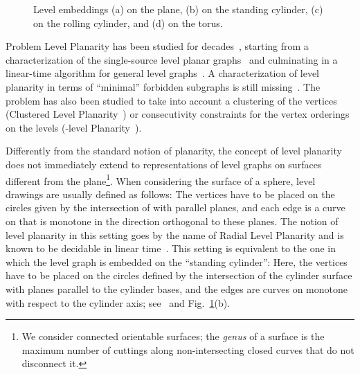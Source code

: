 \documentclass{llncs}
\begin{document}
\begin{figure}[tb!]
    \centering
      \hfill
      \hfill
      \hfill
    \caption{Level embeddings (a) on the plane, (b) on the standing cylinder, (c) on the rolling cylinder, and (d) on the torus.}
\label{fig:drawings}
\end{figure}

Problem {\sc Level Planarity} has been studied for decades~\cite{dn-hpt-88,hp-rlpdlt-95,jlm-lptlt-98,rsbhkmsc-sfplg-01,Fulek2013}, starting from a characterization of the single-source level planar graphs~\cite{dn-hpt-88} and culminating in a linear-time algorithm for general level graphs~\cite{jlm-lptlt-98}.
A characterization of level planarity in terms of ``minimal'' forbidden subgraphs is still missing~\cite{efk-clptmp-09,hkl-clpg-04}.
The problem has also been studied to take into account a clustering of the vertices ({\sc Clustered Level Planarity}~\cite{tibp-addfr-15,fb-clp-04}) or consecutivity constraints for the vertex orderings on the levels ({\sc -level Planarity}~\cite{tibp-addfr-15,wsp-gktlg-12}).

Differently from the standard notion of planarity, the concept of level planarity does not immediately extend to representations of level graphs on surfaces different from the plane\footnote{We consider connected orientable surfaces; the {\em genus} of a surface is the maximum number of cuttings along non-intersecting closed curves that do not disconnect it.}. When considering the surface  of a sphere, level drawings are usually defined as follows: The vertices have to be placed on the  circles given by the intersection of  with  parallel planes, and each edge is a curve on  that is monotone in the direction orthogonal to these planes. The notion of level planarity in this setting goes by the name of {\sc Radial Level Planarity} and is known to be decidable in linear time~\cite{bbf-rlptelt-05}. This setting is equivalent to the one in which the level graph is embedded on the ``standing cylinder'': Here, the vertices have to be placed on the circles defined by the intersection of the cylinder surface  with planes parallel to the cylinder bases, and the edges are curves on  monotone with respect to the cylinder axis; see~\cite{abbg-cpue-12,bbf-rlptelt-05,b-updsrc-14} and Fig.~\ref{fig:drawings}(b).  
\end{document}
